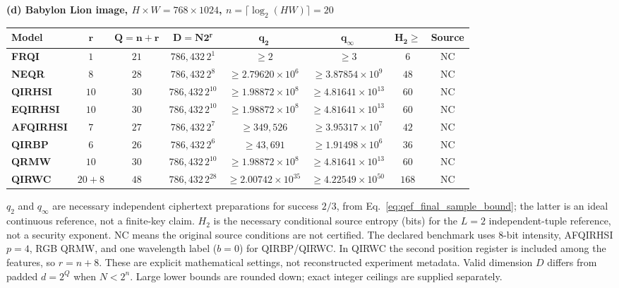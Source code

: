 \documentclass[11pt,a4paper]{article}
\begin{document}
{\begin{table}
\par\vspace{0.3cm}
\textbf{(d) Babylon Lion image, $H\times W=768\times1024$, $n=\lceil\log_2(HW)\rceil=20$}\\[3pt]
{\footnotesize\setlength{\tabcolsep}{4pt}
\begin{tabular}{lccccccc}
\hline\rowcolor{Bisque3}
\textbf{Model} & $\boldsymbol{r}$ & $\boldsymbol{Q=n+r}$ & $\boldsymbol{D=N2^r}$ & $\boldsymbol{q_2}$ & $\boldsymbol{q_\infty}$ & $\boldsymbol{H_2\geq}$ & \textbf{Source}\\
\hline
\textbf{FRQI} & \(1\) & \(21\) & \(786{,}432\,2^{1}\) & $\geq 2$ & $\geq 3$ & \(6\) & NC \\
\textbf{NEQR} & \(8\) & \(28\) & \(786{,}432\,2^{8}\) & $\geq 2.79620\times10^{6}$ & $\geq 3.87854\times10^{9}$ & \(48\) & NC \\
\textbf{QIRHSI} & \(10\) & \(30\) & \(786{,}432\,2^{10}\) & $\geq 1.98872\times10^{8}$ & $\geq 4.81641\times10^{13}$ & \(60\) & NC \\
\textbf{EQIRHSI} & \(10\) & \(30\) & \(786{,}432\,2^{10}\) & $\geq 1.98872\times10^{8}$ & $\geq 4.81641\times10^{13}$ & \(60\) & NC \\
\textbf{AFQIRHSI} & \(7\) & \(27\) & \(786{,}432\,2^{7}\) & $\geq 349{,}526$ & $\geq 3.95317\times10^{7}$ & \(42\) & NC \\
\textbf{QIRBP} & \(6\) & \(26\) & \(786{,}432\,2^{6}\) & $\geq 43{,}691$ & $\geq 1.91498\times10^{6}$ & \(36\) & NC \\
\textbf{QRMW} & \(10\) & \(30\) & \(786{,}432\,2^{10}\) & $\geq 1.98872\times10^{8}$ & $\geq 4.81641\times10^{13}$ & \(60\) & NC \\
\textbf{QIRWC} & \(20+8\) & \(48\) & \(786{,}432\,2^{28}\) & $\geq 2.00742\times10^{35}$ & $\geq 4.22549\times10^{50}$ & \(168\) & NC \\
\hline\end{tabular}}\par
\vspace{0.2cm}
\parbox{\textwidth}{\footnotesize\color{red}
$q_2$ and $q_\infty$ are necessary independent ciphertext preparations for success $2/3$, from Eq.~\eqref{eq:qef_final_sample_bound}; the latter is an ideal continuous reference, not a finite-key claim.
$H_2$ is the necessary conditional source entropy (bits) for the $L=2$ independent-tuple reference, not a security exponent. NC means the original source conditions are not certified.
The declared benchmark uses 8-bit intensity, AFQIRHSI $p=4$, RGB QRMW, and one wavelength label ($b=0$) for QIRBP/QIRWC. In QIRWC the second position register is included among the features, so $r=n+8$.
These are explicit mathematical settings, not reconstructed experiment metadata.
Valid dimension $D$ differs from padded $d=2^Q$ when $N<2^n$.
Large lower bounds are rounded down; exact integer ceilings are supplied separately.}
\end{table}


}
\end{document}
